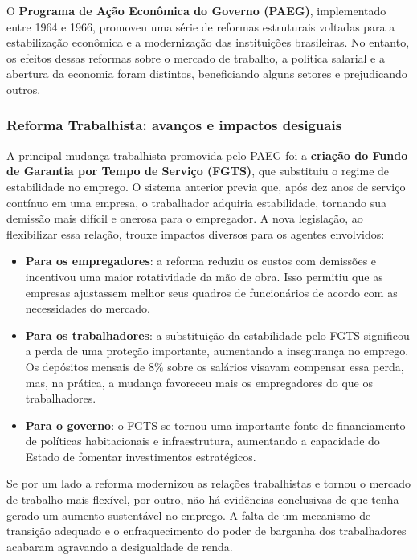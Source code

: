 \documentclass[a4paper,12pt]{article}[abntex2]
\begin{document}
O \textbf{Programa de Ação Econômica do Governo (PAEG)}, implementado entre 1964 e 1966, promoveu uma série de reformas estruturais voltadas para a estabilização econômica e a modernização das instituições brasileiras. No entanto, os efeitos dessas reformas sobre o mercado de trabalho, a política salarial e a abertura da economia foram distintos, beneficiando alguns setores e prejudicando outros.

\subsubsection{Reforma Trabalhista: avanços e impactos desiguais}
A principal mudança trabalhista promovida pelo PAEG foi a \textbf{criação do Fundo de Garantia por Tempo de Serviço (FGTS)}, que substituiu o regime de estabilidade no emprego. O sistema anterior previa que, após dez anos de serviço contínuo em uma empresa, o trabalhador adquiria estabilidade, tornando sua demissão mais difícil e onerosa para o empregador. A nova legislação, ao flexibilizar essa relação, trouxe impactos diversos para os agentes envolvidos:

\begin{itemize}
    \item \textbf{Para os empregadores}: a reforma reduziu os custos com demissões e incentivou uma maior rotatividade da mão de obra. Isso permitiu que as empresas ajustassem melhor seus quadros de funcionários de acordo com as necessidades do mercado.
    \item \textbf{Para os trabalhadores}: a substituição da estabilidade pelo FGTS significou a perda de uma proteção importante, aumentando a insegurança no emprego. Os depósitos mensais de 8\% sobre os salários visavam compensar essa perda, mas, na prática, a mudança favoreceu mais os empregadores do que os trabalhadores.
    \item \textbf{Para o governo}: o FGTS se tornou uma importante fonte de financiamento de políticas habitacionais e infraestrutura, aumentando a capacidade do Estado de fomentar investimentos estratégicos.
\end{itemize}

Se por um lado a reforma modernizou as relações trabalhistas e tornou o mercado de trabalho mais flexível, por outro, não há evidências conclusivas de que tenha gerado um aumento sustentável no emprego. A falta de um mecanismo de transição adequado e o enfraquecimento do poder de barganha dos trabalhadores acabaram agravando a desigualdade de renda.
\end{document}

